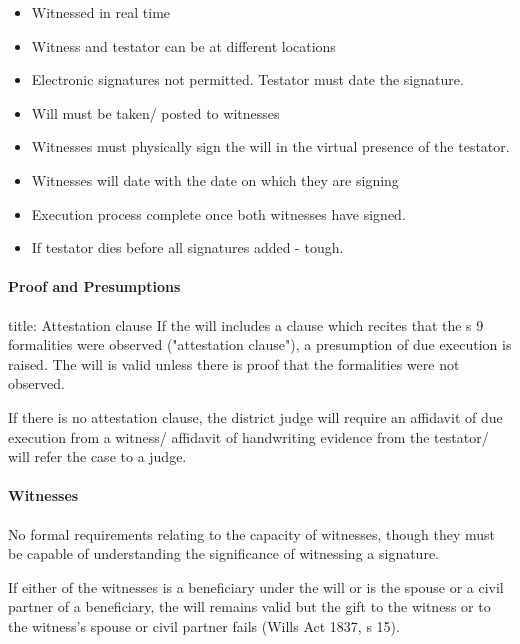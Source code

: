 \documentclass[
]{article}
\newenvironment{Shaded}{}{}
\newcommand{\NormalTok}[1]{#1}
\providecommand{\tightlist}{%
  \setlength{\itemsep}{0pt}\setlength{\parskip}{0pt}}
\begin{document}
\begin{itemize}
\tightlist
\item
  Witnessed in real time
\item
  Witness and testator can be at different locations
\item
  Electronic signatures not permitted. Testator must date the signature.
\item
  Will must be taken/ posted to witnesses
\item
  Witnesses must physically sign the will in the virtual presence of the
  testator.
\item
  Witnesses will date with the date on which they are signing
\item
  Execution process complete once both witnesses have signed.
\item
  If testator dies before all signatures added - tough.
\end{itemize}

\hypertarget{proof-and-presumptions-2}{%
\paragraph{Proof and Presumptions}\label{proof-and-presumptions-2}}

\begin{Shaded}
\begin{Highlighting}[]
\NormalTok{title: Attestation clause}
\NormalTok{If the will includes a clause which recites that the s 9 formalities were observed ("attestation clause"), a presumption of due execution is raised. The will is valid unless there is proof that the formalities were not observed.}
\end{Highlighting}
\end{Shaded}

If there is no attestation clause, the district judge will require an
affidavit of due execution from a witness/ affidavit of handwriting
evidence from the testator/ will refer the case to a judge.

\hypertarget{witnesses}{%
\paragraph{Witnesses}\label{witnesses}}

No formal requirements relating to the capacity of witnesses, though
they must be capable of understanding the significance of witnessing a
signature.

If either of the witnesses is a beneficiary under the will or is the
spouse or a civil partner of a beneficiary, the will remains valid but
the gift to the witness or to the witness's spouse or civil partner
fails (Wills Act 1837, s 15).
\end{document}
